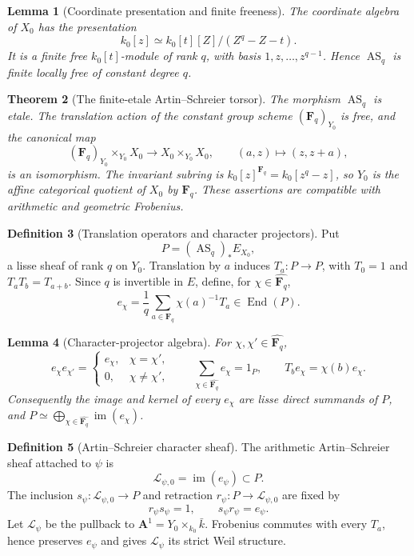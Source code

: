 \documentclass[10pt]{article}
\newtheorem{theorem}{Theorem}[section]
\newtheorem{lemma}[theorem]{Lemma}
\theoremstyle{definition}
\newtheorem{definition}[theorem]{Definition}
\newcommand{\Fq}{\mathbf F_q}
\newcommand{\Aone}{\mathbf A^1}
\begin{document}
\begin{lemma}[Coordinate presentation and finite freeness]
The coordinate algebra of \(X_0\) has the presentation
\[
 k_0[z]\simeq k_0[t][Z]/(Z^q-Z-t).
\]
It is a finite free \(k_0[t]\)-module of rank \(q\), with basis
\(1,z,\ldots,z^{q-1}\).  Hence \(\operatorname{AS}_q\) is finite locally
free of constant degree \(q\).
\end{lemma}

\begin{theorem}[The finite-etale Artin--Schreier torsor]
The morphism \(\operatorname{AS}_q\) is etale.  The translation action of
the constant group scheme \((\Fq)_{Y_0}\) is free, and the canonical map
\[
 (\Fq)_{Y_0}\times_{Y_0}X_0
 \longrightarrow X_0\times_{Y_0}X_0,
 \qquad (a,z)\longmapsto(z,z+a),
\]
is an isomorphism.  The invariant subring is
\(k_0[z]^{\Fq}=k_0[z^q-z]\), so \(Y_0\) is the affine categorical quotient
of \(X_0\) by \(\Fq\).  These assertions are compatible with arithmetic
and geometric Frobenius.
\end{theorem}

\begin{definition}[Translation operators and character projectors]
Put
\[
 P=(\operatorname{AS}_q)_*E_{X_0},
\]
a lisse sheaf of rank \(q\) on \(Y_0\).  Translation by \(a\) induces
\(T_a:P\to P\), with \(T_0=1\) and \(T_aT_b=T_{a+b}\).  Since \(q\) is
invertible in \(E\), define, for \(\chi\in\widehat{\Fq}\),
\[
 e_\chi=\frac1q\sum_{a\in\Fq}\chi(a)^{-1}T_a
       \in\operatorname{End}(P).
\]
\end{definition}

\begin{lemma}[Character-projector algebra]
For \(\chi,\chi'\in\widehat{\Fq}\),
\[
 e_\chi e_{\chi'}=\begin{cases}e_\chi,&\chi=\chi',\\0,&\chi\ne\chi',
 \end{cases}
 \qquad
 \sum_{\chi\in\widehat{\Fq}}e_\chi=1_P,
 \qquad
 T_b e_\chi=\chi(b)e_\chi.
\]
Consequently the image and kernel of every \(e_\chi\) are lisse direct
summands of \(P\), and
\(P\simeq\bigoplus_{\chi\in\widehat{\Fq}}\operatorname{im}(e_\chi)\).
\end{lemma}

\begin{definition}[Artin--Schreier character sheaf]
The arithmetic Artin--Schreier sheaf attached to \(\psi\) is
\[
 \mathcal L_{\psi,0}=\operatorname{im}(e_\psi)\subset P.
\]
The inclusion \(s_\psi:\mathcal L_{\psi,0}\to P\) and retraction
\(r_\psi:P\to\mathcal L_{\psi,0}\) are fixed by
\[
 r_\psi s_\psi=1,\qquad s_\psi r_\psi=e_\psi.
\]
Let \(\mathcal L_\psi\) be the pullback to
\(\Aone=Y_0\times_{k_0}\bar k\).  Frobenius commutes with every
\(T_a\), hence preserves \(e_\psi\) and gives
\(\mathcal L_\psi\) its strict Weil structure.
\end{definition}
\end{document}
